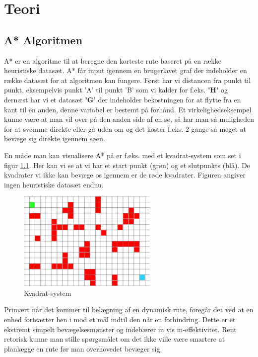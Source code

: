 \chapter{Teori}

\section{A* Algoritmen}

A* er en algoritme til at beregne den korteste rute baseret på en række heuristiske datasæt. A* får input igennem en brugerlavet graf der indeholder en række datasæt for at algoritmen kan fungere.  Først har vi distancen fra punkt til punkt, eksempelvis punkt 'A' til punkt 'B' som vi kalder for f.eks. \textbf{'H'} og dernæst har vi et datasæt \textbf{'G'} der indeholder bekostningen for at flytte fra en kant til en anden, denne variabel er bestemt på forhånd. Et virkelighedseksempel kunne være at man vil over på den anden side af en sø, så har man så muligheden for at svømme direkte eller gå uden om og det koster f.eks. 2 gange så meget at bevæge sig direkte igennem søen.

En måde man kan visualisere A* på er f.eks. med et kvadrat-system som set i figur \ref{A*Kvadrat-1}. Her kan vi se at vi har et start punkt (grøn) og et slutpunkts (blå). De kvadrater vi ikke kan bevæge os igennem er de røde kvadrater. Figuren angiver ingen heuristiske datasæt endnu.

\begin{figure}
    \centering
    \includegraphics[width=0.60\textwidth]{Pictures/Teoriafsnit/Figurfiler/Grid1.png}
    \caption{Kvadrat-system}
    \label{A*Kvadrat-1}
\end{figure}

Primært når det kommer til belægning af en dynamisk rute, foregår det ved at en enhed fortsætter hen i mod et mål indtil den når en forhindring. Dette er et ekstremt simpelt bevægelsesmønster og indebærer in vis in-effektivitet. Rent retorisk kunne man stille spørgsmålet om det ikke ville være smartere at planlægge en rute før man overhovedet bevæger sig.